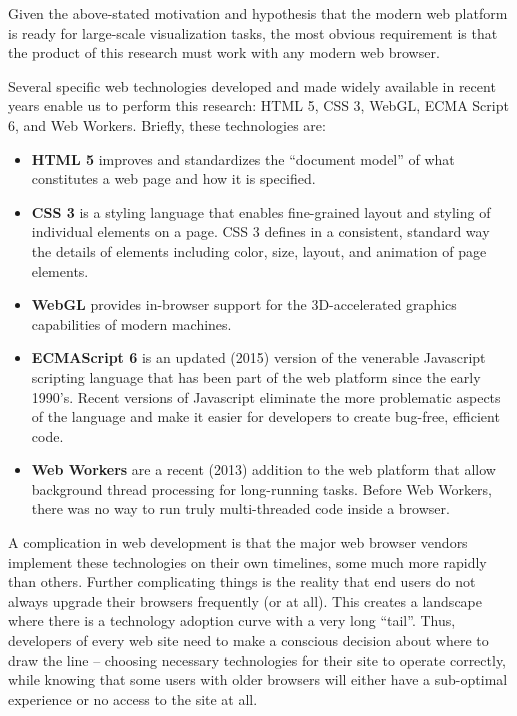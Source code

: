 Given the above-stated motivation and hypothesis that the modern web platform is ready for large-scale visualization tasks, the most obvious requirement is that the product of this research must work with any modern web browser.

Several specific web technologies developed and made widely available in recent years enable us to perform this research: HTML 5, CSS 3, WebGL, ECMA Script 6, and Web Workers. Briefly, these technologies are:

\begin{itemize}
\tightlist
\item
  \textbf{HTML 5} improves and standardizes the ``document model'' of
  what constitutes a web page and how it is specified.
\item
  \textbf{CSS 3} is a styling language that enables fine-grained layout
  and styling of individual elements on a page. CSS 3 defines in a
  consistent, standard way the details of elements including color,
  size, layout, and animation of page elements.
\item
  \textbf{WebGL} provides in-browser support for the 3D-accelerated
  graphics capabilities of modern machines.
\item
  \textbf{ECMAScript 6} is an updated (2015) version of the venerable
  Javascript scripting language that has been part of the web platform
  since the early 1990's. Recent versions of Javascript eliminate the
  more problematic aspects of the language and make it easier for
  developers to create bug-free, efficient code.
\item
  \textbf{Web Workers} are a recent (2013) addition to the web platform
  that allow background thread processing for long-running tasks. Before
  Web Workers, there was no way to run truly multi-threaded code inside
  a browser.
\end{itemize}

A complication in web development is that the major web browser vendors implement these technologies on their own timelines, some much more rapidly than others. Further complicating things is the reality that end users do not always upgrade their browsers frequently (or at all). This creates a landscape where there is a technology adoption curve with a very long ``tail''. Thus, developers of every web site need to make a conscious decision about where to draw the line -- choosing necessary technologies for their site to operate correctly, while knowing that some users with older browsers will either have a sub-optimal experience or no access to the site at all.

